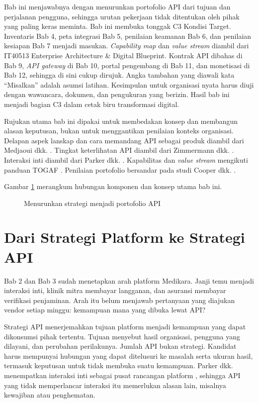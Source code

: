 Bab ini menjawabnya dengan menurunkan portofolio API dari tujuan dan perjalanan pengguna, sehingga urutan pekerjaan tidak
ditentukan oleh pihak yang paling keras meminta. Bab ini membuka tonggak C3 Kondisi Target. Inventaris Bab 4, peta
integrasi Bab 5, penilaian keamanan Bab 6, dan penilaian kesiapan Bab 7 menjadi masukan. \textit{Capability map} dan
\textit{value stream} diambil dari IT40513 Enterprise Architecture \& Digital Blueprint. Kontrak API dibahas di Bab 9,
\textit{API gateway} di Bab 10, portal pengembang di Bab 11, dan monetisasi di Bab 12, sehingga di sini cukup dirujuk.
Angka tambahan yang diawali kata ``Misalkan'' adalah asumsi latihan. Kesimpulan untuk organisasi nyata harus diuji dengan
wawancara, dokumen, dan pengukuran yang berizin. Hasil bab ini menjadi bagian C3 dalam cetak biru transformasi digital.

Rujukan utama bab ini dipakai untuk membedakan konsep dan membangun alasan keputusan, bukan untuk menggantikan penilaian
konteks organisasi. Delapan aspek lanskap dan cara memandang API sebagai produk diambil dari Medjaoui dkk.
\cite{medjaoui2021continuous}. Tingkat keterlihatan API diambil dari Zimmermann dkk. \cite{zimmermann2022patterns}.
Interaksi inti diambil dari Parker dkk. \cite{parker2016platform}. Kapabilitas dan \textit{value stream} mengikuti panduan
TOGAF \cite{c08-togaf-g211, c08-togaf-g178}. Penilaian portofolio bersandar pada studi Cooper dkk. \cite{c08-cooper1999}.

Gambar \ref{fig:ch08-ilustrasi-bab} merangkum hubungan komponen dan konsep utama bab ini.
\begin{figure}[!htb]
  \centering
  
  \caption{Menurunkan strategi menjadi portofolio API}
  \label{fig:ch08-ilustrasi-bab}
\end{figure}

\section{Dari Strategi Platform ke Strategi API}

Bab 2 dan Bab 3 sudah menetapkan arah platform Medikara. Janji temu menjadi interaksi inti, klinik mitra membayar
langganan, dan asuransi membayar verifikasi penjaminan. Arah itu belum menjawab pertanyaan yang diajukan vendor setiap
minggu: kemampuan mana yang dibuka lewat API?

Strategi API menerjemahkan tujuan platform menjadi kemampuan yang dapat dikonsumsi pihak tertentu. Tujuan menyebut hasil
organisasi, pengguna yang dilayani, dan perubahan perilakunya. Jumlah API bukan strategi. Kandidat harus mempunyai hubungan
yang dapat ditelusuri ke masalah serta ukuran hasil, termasuk keputusan untuk tidak membuka suatu kemampuan. Parker dkk.
menempatkan interaksi inti sebagai pusat rancangan platform \cite{parker2016platform}, sehingga API yang tidak
memperlancar interaksi itu memerlukan alasan lain, misalnya kewajiban atau penghematan.

